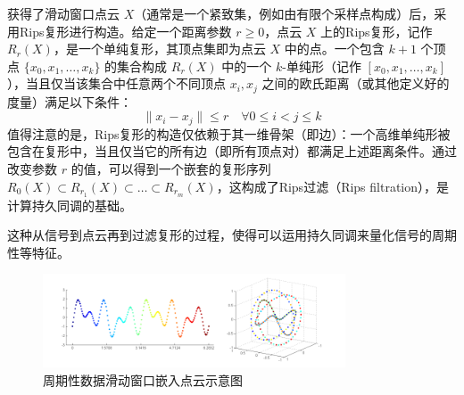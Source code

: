 获得了滑动窗口点云 $X$（通常是一个紧致集，例如由有限个采样点构成）后，采用Rips复形进行构造。给定一个距离参数 $r \ge 0$，点云 $X$ 上的Rips复形，记作 $R_r(X)$，是一个单纯复形，其顶点集即为点云 $X$ 中的点。一个包含 $k+1$ 个顶点 $\{x_0, x_1, \ldots, x_k\}$ 的集合构成 $R_r(X)$ 中的一个 $k$-单纯形（记作 $[x_0, x_1, \ldots, x_k]$），当且仅当该集合中任意两个不同顶点 $x_i, x_j$ 之间的欧氏距离（或其他定义好的度量）满足以下条件：
\begin{equation}
    \|x_i - x_j\| \leq r \quad \forall 0 \leq i < j \leq k
\end{equation}
值得注意的是，Rips复形的构造仅依赖于其一维骨架（即边）：一个高维单纯形被包含在复形中，当且仅当它的所有边（即所有顶点对）都满足上述距离条件。通过改变参数 $r$ 的值，可以得到一个嵌套的复形序列 $R_0(X) \subset R_{r_1}(X) \subset \ldots \subset R_{r_m}(X)$，这构成了Rips过滤（Rips filtration），是计算持久同调的基础。

这种从信号到点云再到过滤复形的过程，使得可以运用持久同调来量化信号的周期性等特征。

\begin{figure}[thbp!]
    \centering
    \includegraphics[width=0.8\textwidth]{figure/滑动窗口嵌入示意图、.png}
    \caption{周期性数据滑动窗口嵌入点云示意图}
\end{figure}

